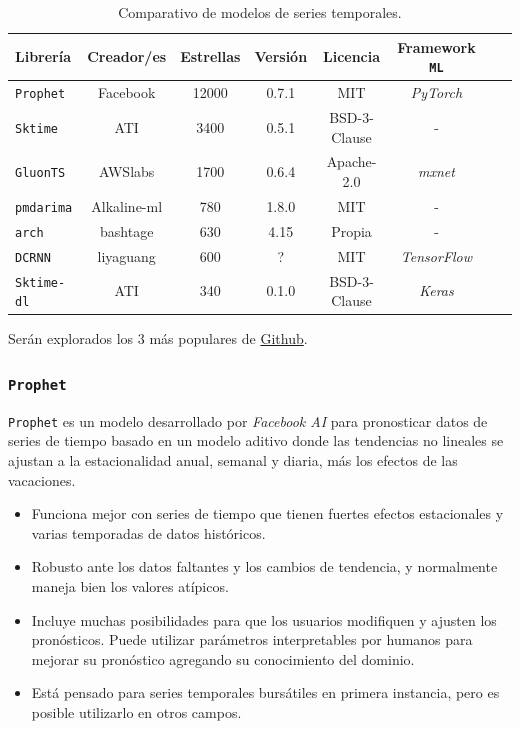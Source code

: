 \documentclass[a4paper,12pt]{article}
\begin{document}
\begin{table}[H]
\centering
\begin{adjustwidth}{-0.5cm}{}
\begin{tabular}{l|ccccccc}
Librería & Creador/es   & Estrellas & Versión     & Licencia     & Framework \texttt{ML} \\ \hline
\texttt{Prophet}          & Facebook                      & 12000              & 0.7.1          & MIT          & \textit{PyTorch}      \\
\texttt{Sktime}           & ATI  & 3400               & 0.5.1          & BSD-3-Clause & -            \\
\texttt{GluonTS}          & AWSlabs                           & 1700               & 0.6.4        & Apache-2.0   & \textit{mxnet}        \\
\texttt{pmdarima}         & Alkaline-ml                          & 780                & 1.8.0          & MIT          & -            \\
\texttt{arch}             & bashtage                                    & 630                & 4.15           & Propia       & -            \\
\texttt{DCRNN}            & liyaguang                                  & 600          &  ?                    & MIT          & \textit{TensorFlow}   \\
\texttt{Sktime-dl}        & ATI                    & 340                & 0.1.0   & BSD-3-Clause & \textit{Keras}       
\end{tabular}
\end{adjustwidth}
\caption{Comparativo de modelos de series temporales.}
\label{tab:ts-models}
\end{table}

Serán explorados los 3 más populares de \href{http://www.github.com}{Github}.

\subsubsection{\texttt{Prophet}}
\texttt{Prophet} es un modelo desarrollado por \textit{Facebook AI} para pronosticar datos de series de tiempo basado en un modelo aditivo donde las tendencias no lineales se ajustan a la estacionalidad anual, semanal y diaria, más los efectos de las vacaciones. \citep{prophet}

\begin{itemize}
	\item Funciona mejor con series de tiempo que tienen fuertes efectos estacionales y varias temporadas de datos históricos.
	\item Robusto ante los datos faltantes y los cambios de tendencia, y normalmente maneja bien los valores atípicos.
	\item Incluye muchas posibilidades para que los usuarios modifiquen y ajusten los pronósticos. Puede utilizar parámetros interpretables por humanos para mejorar su pronóstico agregando su conocimiento del dominio.
	\item Está pensado para series temporales bursátiles en primera instancia, pero es posible utilizarlo en otros campos.
\end{itemize}
\end{document}
